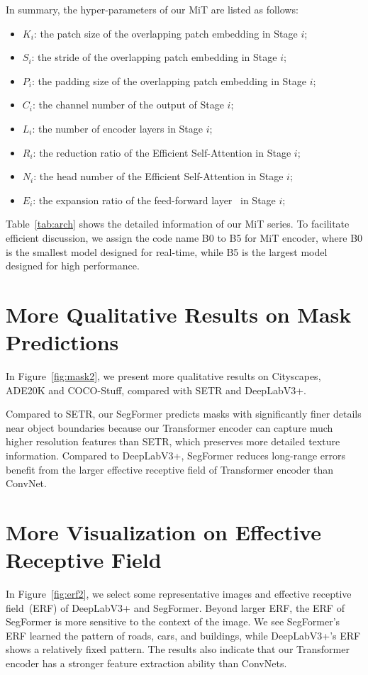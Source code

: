 \documentclass{article}
\begin{document}
In summary, the hyper-parameters of our MiT are listed as follows:
\begin{itemize}
    \item $K_i$: the patch size of the overlapping patch embedding in Stage $i$;
    \item $S_i$: the stride of the overlapping patch embedding in Stage $i$;
    \item $P_i$: the padding size of the overlapping patch embedding in Stage $i$;
    \item $C_i$: the channel number of the output of Stage $i$;
    \item $L_i$: the number of encoder layers in Stage $i$;
    \item $R_i$: the reduction ratio of the Efficient Self-Attention in Stage $i$;
    \item $N_i$: the head number of the Efficient Self-Attention in Stage $i$;
    \item $E_i$: the expansion ratio of the feed-forward layer~\cite{vaswani2017attention} in Stage $i$;
\end{itemize}

Table~\ref{tab:arch} shows the detailed information of our MiT series. 
To facilitate efficient discussion, we assign the code name B0 to B5 for MiT encoder, where B0 is the smallest model designed for real-time, while B5 is the largest model designed for high performance.

\section{More Qualitative Results on Mask Predictions}
In Figure~\ref{fig:mask2}, we present more qualitative results on Cityscapes, ADE20K and COCO-Stuff, compared with SETR and DeepLabV3+. 

Compared to SETR, our SegFormer predicts masks with significantly finer details near object boundaries because our Transformer encoder can capture much higher resolution features than SETR, which preserves more detailed texture information.
Compared to DeepLabV3+, SegFormer reduces long-range errors benefit from the larger effective receptive field of Transformer encoder than ConvNet.

\section{More Visualization on  Effective Receptive Field}
In Figure~\ref{fig:erf2}, we select some representative images and effective receptive field~(ERF) of DeepLabV3+ and SegFormer. Beyond larger ERF, the ERF of SegFormer is more sensitive to the context of the image. We see SegFormer's ERF learned the pattern of roads, cars, and buildings, while DeepLabV3+'s ERF shows a relatively fixed pattern. The results also indicate that our Transformer encoder has a stronger feature extraction ability than ConvNets.
\end{document}
